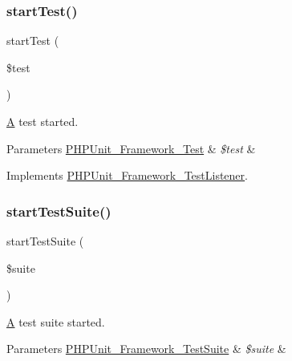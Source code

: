 \subsubsection{\texorpdfstring{start\+Test()}{startTest()}}
{\footnotesize\ttfamily start\+Test (\begin{DoxyParamCaption}\item[{\mbox{\hyperlink{interface_p_h_p_unit___framework___test}{P\+H\+P\+Unit\+\_\+\+Framework\+\_\+\+Test}}}]{\$test }\end{DoxyParamCaption})}

\mbox{\hyperlink{class_a}{A}} test started.


\begin{DoxyParams}[1]{Parameters}
\mbox{\hyperlink{interface_p_h_p_unit___framework___test}{P\+H\+P\+Unit\+\_\+\+Framework\+\_\+\+Test}} & {\em \$test} & \\
\hline
\end{DoxyParams}


Implements \mbox{\hyperlink{interface_p_h_p_unit___framework___test_listener_a1a9bddc54f26bb3fb5c2ec9778ea5198}{P\+H\+P\+Unit\+\_\+\+Framework\+\_\+\+Test\+Listener}}.

\mbox{\label{class_p_h_p_unit___extensions___ticket_listener_a901a86a623d83184267b21f2daee0ff5}} 
\subsubsection{\texorpdfstring{start\+Test\+Suite()}{startTestSuite()}}
{\footnotesize\ttfamily start\+Test\+Suite (\begin{DoxyParamCaption}\item[{\mbox{\hyperlink{class_p_h_p_unit___framework___test_suite}{P\+H\+P\+Unit\+\_\+\+Framework\+\_\+\+Test\+Suite}}}]{\$suite }\end{DoxyParamCaption})}

\mbox{\hyperlink{class_a}{A}} test suite started.


\begin{DoxyParams}[1]{Parameters}
\mbox{\hyperlink{class_p_h_p_unit___framework___test_suite}{P\+H\+P\+Unit\+\_\+\+Framework\+\_\+\+Test\+Suite}} & {\em \$suite} & \\
\hline
\end{DoxyParams}


